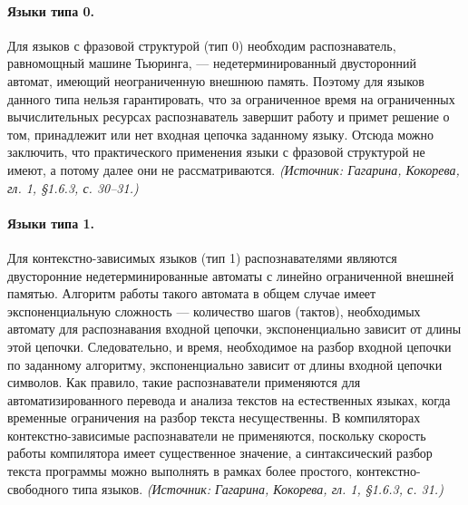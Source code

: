 \documentclass[a4paper,12pt]{article}
\begin{document}
\paragraph{Языки типа 0.}
Для языков с фразовой структурой (тип 0) необходим распознаватель, равномощный машине Тьюринга, — недетерминированный двусторонний автомат, имеющий неограниченную внешнюю память. Поэтому для языков данного типа нельзя гарантировать, что за ограниченное время на ограниченных вычислительных ресурсах распознаватель завершит работу и примет решение о том, принадлежит или нет входная цепочка заданному языку. Отсюда можно заключить, что практического применения языки с фразовой структурой не имеют, а потому далее они не рассматриваются.
\textit{(Источник: Гагарина, Кокорева, гл. 1, §1.6.3, с. 30--31.)}

\paragraph{Языки типа 1.}
Для контекстно-зависимых языков (тип 1) распознавателями являются двусторонние недетерминированные автоматы с линейно ограниченной внешней памятью. Алгоритм работы такого автомата в общем случае имеет экспоненциальную сложность — количество шагов (тактов), необходимых автомату для распознавания входной цепочки, экспоненциально зависит от длины этой цепочки. Следовательно, и время, необходимое на разбор входной цепочки по заданному алгоритму, экспоненциально зависит от длины входной цепочки символов. Как правило, такие распознаватели применяются для автоматизированного перевода и анализа текстов на естественных языках, когда временные ограничения на разбор текста несущественны. В компиляторах контекстно-зависимые распознаватели не применяются, поскольку скорость работы компилятора имеет существенное значение, а синтаксический разбор текста программы можно выполнять в рамках более простого, контекстно-свободного типа языков.
\textit{(Источник: Гагарина, Кокорева, гл. 1, §1.6.3, с. 31.)}
\end{document}
